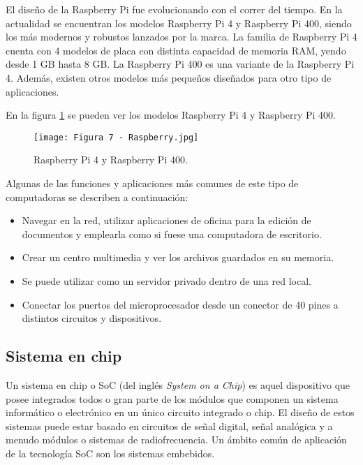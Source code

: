 El diseño de la Raspberry Pi fue evolucionando con el correr del tiempo. En la actualidad se encuentran los modelos Raspberry Pi 4 y Raspberry Pi 400, siendo los más modernos y robustos lanzados por la marca. La familia de Raspberry Pi 4 cuenta con 4 modelos de placa con distinta capacidad de memoria RAM, yendo desde 1 GB hasta 8 GB. La Raspberry Pi 400 es una variante de la Raspberry Pi 4. Además, existen otros modelos más pequeños diseñados para otro tipo de aplicaciones.

En la figura \ref{fig:7} se pueden ver los modelos Raspberry Pi 4 y Raspberry Pi 400.

\begin{figure}[h]
\centering
\texttt{[image: Figura 7 - Raspberry.jpg]}
\caption[Raspberry Pi]{Raspberry Pi 4 y Raspberry Pi 400. \footnotemark}
\label{fig:7}
\end{figure}

Algunas de las funciones y aplicaciones más comunes de este tipo de computadoras se describen a continuación:

\begin{itemize}
	\item Navegar en la red, utilizar aplicaciones de oficina para la edición de documentos y emplearla como si fuese una computadora de escritorio.
	\item Crear un centro multimedia y ver los archivos guardados en su memoria.
	\item Se puede utilizar como un servidor privado dentro de una red local.
	\item Conectar los puertos del microprocesador desde un conector de 40 pines a distintos circuitos y dispositivos.
\end{itemize}

\subsection{Sistema en chip}

Un sistema en chip o SoC (del inglés \textit{System on a Chip}) es aquel dispositivo que posee integrados todos o gran parte de los módulos que componen un sistema informático o electrónico en un único circuito integrado o chip. El diseño de estos sistemas puede estar basado en circuitos de señal digital, señal analógica y a menudo módulos o sistemas de radiofrecuencia. Un ámbito común de aplicación de la tecnología SoC son los sistemas embebidos.


